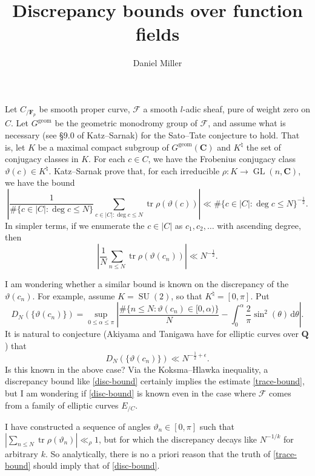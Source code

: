\documentclass{article}
\title{Discrepancy bounds over function fields}
\author{Daniel Miller}
\DeclareMathOperator{\GL}{GL}
\DeclareMathOperator{\SU}{SU}
\DeclareMathOperator{\tr}{tr}
\newcommand{\bC}{\mathbf{C}}
\newcommand{\bF}{\mathbf{F}}
\newcommand{\bQ}{\mathbf{Q}}
\newcommand{\cF}{\mathcal{F}}
\begin{document}
\maketitle





Let $C_{/\bF_p}$ be smooth proper curve, $\cF$ a smooth $l$-adic sheaf, pure of 
weight zero on $C$. Let $G^\mathrm{geom}$ be the geometric monodromy group of 
$\cF$, and assume what is necessary (see \S9.0 of Katz--Sarnak) for the 
Sato--Tate conjecture to hold. That is, let $K$ be a maximal compact subgroup 
of $G^\mathrm{geom}(\bC)$ and $K^\natural$ the set of conjugacy classes in $K$. 
For each $c\in C$, we have the Frobenius conjugacy class 
$\vartheta(c)\in K^\natural$. Katz--Sarnak prove that, for each irreducible 
$\rho\colon K\to \GL(n,\bC)$, we have the bound
\[
	\left| \frac{1}{\#\{c\in |C|:\deg c\leqslant N\}} \sum_{c\in |C|:\deg c\leqslant N} \tr \rho(\vartheta(c))\right| \ll \#\{c\in |C|:\deg c\leqslant N\}^{-\frac 1 2} .
\]
In simpler terms, if we enumerate the $c\in |C|$ as $c_1,c_2,\dots$ with ascending 
degree, then 
\begin{equation}\label{trace-bound}
	\left| \frac{1}{N} \sum_{n\leqslant N} \tr \rho(\vartheta(c_n))\right| \ll N^{-\frac 1 2} .
\end{equation}

I am wondering whether a similar bound is known on the discrepancy of the $\vartheta(c_n)$. 
For example, assume $K=\SU(2)$, so that $K^\natural=[0,\pi]$. Put 
\[
	D_N(\{\vartheta(c_n)\}) = \sup_{0\leqslant \alpha\leqslant \pi} \left| \frac{\#\{n\leqslant N : \vartheta(c_n)\in [0,\alpha)\}}{N} - \int_0^\alpha \frac{2}{\pi} \sin^2(\theta)\, \mathrm{d}\theta\right| .
\]
It is natural to conjecture (Akiyama and Tanigawa have for elliptic curves over 
$\bQ$) that 
\begin{equation}\label{disc-bound}
	D_N(\{\vartheta(c_n)\}) \ll N^{-\frac 1 2+\epsilon} .
\end{equation}
Is this known in the above case? Via the Koksma--Hlawka inequality, a discrepancy 
bound like \eqref{disc-bound} certainly implies the estimate \eqref{trace-bound}, 
but I am wondering if \eqref{disc-bound} is known even in the case where $\cF$ comes 
from a family of elliptic curves $E_{/C}$. 

I have constructed a sequence of angles $\vartheta_n\in [0,\pi]$ such that 
$|\sum_{n\leqslant N} \tr \rho(\vartheta_n)| \ll_\rho 1$, but for which 
the discrepancy decays like $N^{-1/k}$ for arbitrary $k$. So analytically, there is 
no a priori reason that the truth of \eqref{trace-bound} should imply that of 
\eqref{disc-bound}. 
\end{document}
